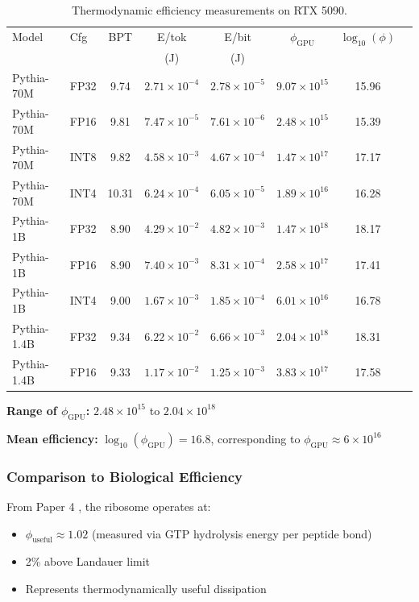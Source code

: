 \documentclass[11pt,a4paper]{article}
\begin{document}
\begin{table}[h]
\centering
\tiny
\begin{tabular}{llcccccc}
\toprule
Model & Cfg & BPT & E/tok & E/bit & $\phi_{\text{GPU}}$ & $\log_{10}(\phi)$ \\
 &  &  & (J) & (J) &  &  \\
\midrule
Pythia-70M & FP32 & 9.74 & $2.71 \times 10^{-4}$ & $2.78 \times 10^{-5}$ & $9.07 \times 10^{15}$ & 15.96 \\
Pythia-70M & FP16 & 9.81 & $7.47 \times 10^{-5}$ & $7.61 \times 10^{-6}$ & $2.48 \times 10^{15}$ & 15.39 \\
Pythia-70M & INT8 & 9.82 & $4.58 \times 10^{-3}$ & $4.67 \times 10^{-4}$ & $1.47 \times 10^{17}$ & 17.17 \\
Pythia-70M & INT4 & 10.31 & $6.24 \times 10^{-4}$ & $6.05 \times 10^{-5}$ & $1.89 \times 10^{16}$ & 16.28 \\
Pythia-1B & FP32 & 8.90 & $4.29 \times 10^{-2}$ & $4.82 \times 10^{-3}$ & $1.47 \times 10^{18}$ & 18.17 \\
Pythia-1B & FP16 & 8.90 & $7.40 \times 10^{-3}$ & $8.31 \times 10^{-4}$ & $2.58 \times 10^{17}$ & 17.41 \\
Pythia-1B & INT4 & 9.00 & $1.67 \times 10^{-3}$ & $1.85 \times 10^{-4}$ & $6.01 \times 10^{16}$ & 16.78 \\
Pythia-1.4B & FP32 & 9.34 & $6.22 \times 10^{-2}$ & $6.66 \times 10^{-3}$ & $2.04 \times 10^{18}$ & 18.31 \\
Pythia-1.4B & FP16 & 9.33 & $1.17 \times 10^{-2}$ & $1.25 \times 10^{-3}$ & $3.83 \times 10^{17}$ & 17.58 \\
\bottomrule
\end{tabular}
\caption{Thermodynamic efficiency measurements on RTX 5090.}
\label{tab:energy}
\end{table}

\textbf{Range of $\phi_{\text{GPU}}$:} $2.48 \times 10^{15}$ to $2.04 \times 10^{18}$

\textbf{Mean efficiency:} $\log_{10}(\phi_{\text{GPU}}) = 16.8$, corresponding to $\phi_{\text{GPU}} \approx 6 \times 10^{16}$

\subsubsection{Comparison to Biological Efficiency}

From Paper 4 \cite{whitmer2025d}, the ribosome operates at:
\begin{itemize}
\item $\phi_{\text{useful}} \approx 1.02$ (measured via GTP hydrolysis energy per peptide bond)
\item 2\% above Landauer limit
\item Represents thermodynamically useful dissipation
\end{itemize}
\end{document}
